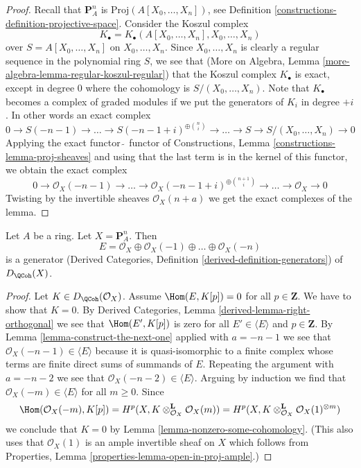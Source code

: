 \begin{proof}
Recall that $\mathbf{P}^n_A$ is $\text{Proj}(A[X_0, \ldots, X_n])$, see
Definition \ref{constructions-definition-projective-space}.
Consider the Koszul complex
$$
K_\bullet = K_\bullet(A[X_0, \ldots, X_n], X_0, \ldots, X_n)
$$
over $S = A[X_0, \ldots, X_n]$ on $X_0, \ldots, X_n$.
Since $X_0, \ldots, X_n$ is clearly a regular sequence in the
polynomial ring $S$, we see that
(More on Algebra, Lemma \ref{more-algebra-lemma-regular-koszul-regular})
that the Koszul complex $K_\bullet$ is exact, except in degree $0$
where the cohomology is $S/(X_0, \ldots, X_n)$.
Note that $K_\bullet$ becomes a complex of graded modules if we
put the generators of $K_i$ in degree $+i$. In other words an
exact complex
$$
0 \to S(-n - 1) \to \ldots \to S(-n - 1 + i)^{\oplus {n \choose i}} \to \ldots
\to S \to S/(X_0, \ldots, X_n) \to 0
$$
Applying the exact functor $\tilde{\ }$ functor of Constructions, 
Lemma \ref{constructions-lemma-proj-sheaves} and using that
the last term is in the kernel of this functor,
we obtain the exact complex
$$
0 \to \mathcal{O}_X(-n - 1) \to \ldots
\to \mathcal{O}_X(-n - 1 + i)^{\oplus {n + 1 \choose i}} \to
\ldots \to \mathcal{O}_X \to 0
$$
Twisting by the invertible sheaves $\mathcal{O}_X(n + a)$
we get the exact complexes of the lemma.
\end{proof}

\begin{lemma}
\label{lemma-generator-P1}
Let $A$ be a ring. Let $X = \mathbf{P}^n_A$. Then
$$
E =
\mathcal{O}_X \oplus \mathcal{O}_X(-1) \oplus \ldots \oplus \mathcal{O}_X(-n)
$$
is a generator
(Derived Categories, Definition \ref{derived-definition-generators})
of $D_\QCoh(X)$.
\end{lemma}

\begin{proof}
Let $K \in D_\QCoh(\mathcal{O}_X)$. Assume
$\Hom(E, K[p]) = 0$ for all $p \in \mathbf{Z}$.
We have to show that $K = 0$.
By Derived Categories, Lemma
\ref{derived-lemma-right-orthogonal}
we see that $\Hom(E', K[p])$ is zero for all $E' \in \langle E \rangle$
and $p \in \mathbf{Z}$.
By Lemma \ref{lemma-construct-the-next-one}
applied with $a = -n - 1$
we see that $\mathcal{O}_X(-n - 1) \in \langle E \rangle$
because it is quasi-isomorphic to a finite complex
whose terms are finite direct sums of summands of $E$.
Repeating the argument with $a = -n - 2$ we see that
$\mathcal{O}_X(-n - 2) \in \langle E \rangle$.
Arguing by induction we find that $\mathcal{O}_X(-m) \in \langle E \rangle$
for all $m \geq 0$.
Since
$$
\Hom(\mathcal{O}_X(-m), K[p]) =
H^p(X, K \otimes_{\mathcal{O}_X}^\mathbf{L} \mathcal{O}_X(m)) =
H^p(X, K \otimes_{\mathcal{O}_X}^\mathbf{L} \mathcal{O}_X(1)^{\otimes m})
$$
we conclude that $K = 0$ by Lemma \ref{lemma-nonzero-some-cohomology}.
(This also uses that $\mathcal{O}_X(1)$ is an ample
invertible sheaf on $X$ which follows from
Properties, Lemma \ref{properties-lemma-open-in-proj-ample}.)
\end{proof}

